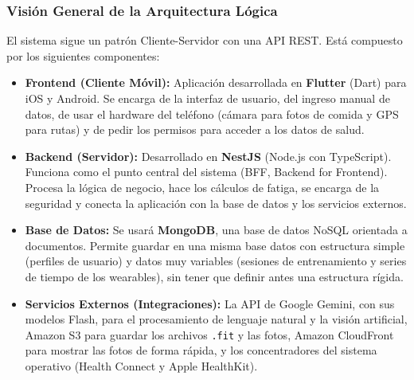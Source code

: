 \subsubsection{Visión General de la Arquitectura Lógica}
El sistema sigue un patrón Cliente-Servidor con una API REST. Está compuesto por los siguientes componentes:
\begin{itemize}
    \item \textbf{Frontend (Cliente Móvil):} Aplicación desarrollada en \textbf{Flutter} (Dart) para iOS y Android. Se encarga de la interfaz de usuario, del ingreso manual de datos, de usar el hardware del teléfono (cámara para fotos de comida y GPS para rutas) y de pedir los permisos para acceder a los datos de salud.
    \item \textbf{Backend (Servidor):} Desarrollado en \textbf{NestJS} (Node.js con TypeScript). Funciona como el punto central del sistema (BFF, Backend for Frontend). Procesa la lógica de negocio, hace los cálculos de fatiga, se encarga de la seguridad y conecta la aplicación con la base de datos y los servicios externos.
    \item \textbf{Base de Datos:} Se usará \textbf{MongoDB}, una base de datos NoSQL orientada a documentos. Permite guardar en una misma base datos con estructura simple (perfiles de usuario) y datos muy variables (sesiones de entrenamiento y series de tiempo de los wearables), sin tener que definir antes una estructura rígida.
    \item \textbf{Servicios Externos (Integraciones):} La API de Google Gemini, con sus modelos Flash, para el procesamiento de lenguaje natural y la visión artificial, Amazon S3 para guardar los archivos \texttt{.fit} y las fotos, Amazon CloudFront para mostrar las fotos de forma rápida, y los concentradores del sistema operativo (Health Connect y Apple HealthKit).
\end{itemize}

